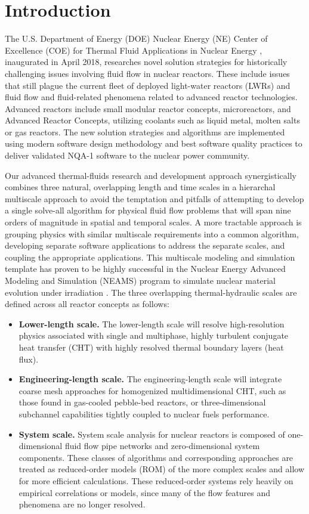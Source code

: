 \section{Introduction}
\label{s:intro}

The U.S. Department of Energy (DOE) Nuclear Energy (NE) Center of Excellence (COE) for Thermal Fluid Applications in Nuclear Energy \cite{shaver2019initial}, inaugurated in April 2018, researches novel solution strategies for historically challenging issues involving fluid flow in nuclear reactors. These include issues that still plague the current fleet of deployed light-water reactors (LWRs) and fluid flow and fluid-related phenomena related to advanced reactor technologies. Advanced reactors include small modular reactor concepts, microreactors, and Advanced Reactor Concepts, utilizing coolants such as liquid metal, molten  salts or gas  reactors. The new solution strategies and algorithms are implemented using modern software design methodology and best software quality practices to deliver validated NQA-1 software to the nuclear power community.

Our advanced thermal-fluids research and development approach synergistically combines three natural, overlapping length and time scales in a hierarchal multiscale approach to avoid the temptation and
pitfalls of attempting to develop a single solve-all algorithm for physical fluid flow problems that will span nine orders of magnitude in spatial and temporal scales. A more tractable approach is grouping physics with similar multiscale requirements into a common algorithm, developing separate software applications to address the separate scales, and coupling the appropriate applications. This multiscale modeling and simulation template has proven to be highly successful in the Nuclear Energy Advanced Modeling and Simulation (NEAMS) program to simulate nuclear material evolution under irradiation \cite{tonks2013multiscale}. The three overlapping thermal-hydraulic scales are defined across all reactor concepts as follows:
\begin{itemize}
    \item \textbf{Lower-length scale.} The lower-length scale will resolve high-resolution physics
    associated with single and multiphase, highly turbulent conjugate heat transfer (CHT) with highly
    resolved thermal boundary layers (heat flux).
    \item \textbf{Engineering-length scale.} The engineering-length scale will integrate coarse mesh approaches
    for homogenized multidimensional CHT, such as those found in gas-cooled pebble-bed reactors, or three-dimensional subchannel capabilities tightly coupled to nuclear fuels performance.
    \item \textbf{System scale.} System scale analysis for nuclear reactors is composed of one-dimensional fluid flow
    pipe networks and zero-dimensional system components. These classes of algorithms and corresponding approaches are treated as reduced-order models (ROM) of the more complex scales and allow for more efficient calculations. These reduced-order systems rely heavily on empirical correlations or models, since many of the flow features and phenomena are no longer resolved.
\end{itemize}

